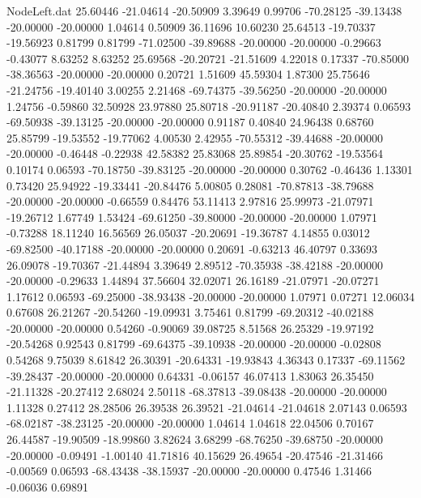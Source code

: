 \begin{filecontents}{NodeLeft.dat}
  25.60446  -21.04614  -20.50909     3.39649    0.99706  -70.28125  -39.13438  -20.00000  -20.00000    1.04614    0.50909   36.11696   10.60230
  25.64513  -19.70337  -19.56923     0.81799    0.81799  -71.02500  -39.89688  -20.00000  -20.00000   -0.29663   -0.43077    8.63252    8.63252
  25.69568  -20.20721  -21.51609     4.22018    0.17337  -70.85000  -38.36563  -20.00000  -20.00000    0.20721    1.51609   45.59304    1.87300
  25.75646  -21.24756  -19.40140     3.00255    2.21468  -69.74375  -39.56250  -20.00000  -20.00000    1.24756   -0.59860   32.50928   23.97880
  25.80718  -20.91187  -20.40840     2.39374    0.06593  -69.50938  -39.13125  -20.00000  -20.00000    0.91187    0.40840   24.96438    0.68760
  25.85799  -19.53552  -19.77062     4.00530    2.42955  -70.55312  -39.44688  -20.00000  -20.00000   -0.46448   -0.22938   42.58382   25.83068
  25.89854  -20.30762  -19.53564     0.10174    0.06593  -70.18750  -39.83125  -20.00000  -20.00000    0.30762   -0.46436    1.13301    0.73420
  25.94922  -19.33441  -20.84476     5.00805    0.28081  -70.87813  -38.79688  -20.00000  -20.00000   -0.66559    0.84476   53.11413    2.97816
  25.99973  -21.07971  -19.26712     1.67749    1.53424  -69.61250  -39.80000  -20.00000  -20.00000    1.07971   -0.73288   18.11240   16.56569
  26.05037  -20.20691  -19.36787     4.14855    0.03012  -69.82500  -40.17188  -20.00000  -20.00000    0.20691   -0.63213   46.40797    0.33693
  26.09078  -19.70367  -21.44894     3.39649    2.89512  -70.35938  -38.42188  -20.00000  -20.00000   -0.29633    1.44894   37.56604   32.02071
  26.16189  -21.07971  -20.07271     1.17612    0.06593  -69.25000  -38.93438  -20.00000  -20.00000    1.07971    0.07271   12.06034    0.67608
  26.21267  -20.54260  -19.09931     3.75461    0.81799  -69.20312  -40.02188  -20.00000  -20.00000    0.54260   -0.90069   39.08725    8.51568
  26.25329  -19.97192  -20.54268     0.92543    0.81799  -69.64375  -39.10938  -20.00000  -20.00000   -0.02808    0.54268    9.75039    8.61842
  26.30391  -20.64331  -19.93843     4.36343    0.17337  -69.11562  -39.28437  -20.00000  -20.00000    0.64331   -0.06157   46.07413    1.83063
  26.35450  -21.11328  -20.27412     2.68024    2.50118  -68.37813  -39.08438  -20.00000  -20.00000    1.11328    0.27412   28.28506   26.39538
  26.39521  -21.04614  -21.04618     2.07143    0.06593  -68.02187  -38.23125  -20.00000  -20.00000    1.04614    1.04618   22.04506    0.70167
  26.44587  -19.90509  -18.99860     3.82624    3.68299  -68.76250  -39.68750  -20.00000  -20.00000   -0.09491   -1.00140   41.71816   40.15629
  26.49654  -20.47546  -21.31466    -0.00569    0.06593  -68.43438  -38.15937  -20.00000  -20.00000    0.47546    1.31466   -0.06036    0.69891

\end{filecontents}
